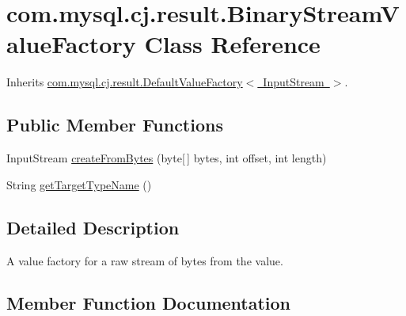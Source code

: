 \hypertarget{classcom_1_1mysql_1_1cj_1_1result_1_1_binary_stream_value_factory}{}\section{com.\+mysql.\+cj.\+result.\+Binary\+Stream\+Value\+Factory Class Reference}
\label{classcom_1_1mysql_1_1cj_1_1result_1_1_binary_stream_value_factory}


Inherits \mbox{\hyperlink{classcom_1_1mysql_1_1cj_1_1result_1_1_default_value_factory}{com.\+mysql.\+cj.\+result.\+Default\+Value\+Factory$<$ Input\+Stream $>$}}.

\subsection*{Public Member Functions}
\begin{DoxyCompactItemize}
\item 
Input\+Stream \mbox{\hyperlink{classcom_1_1mysql_1_1cj_1_1result_1_1_binary_stream_value_factory_a5ef15898b03e5e381e03b3da41bd2e0e}{create\+From\+Bytes}} (byte\mbox{[}$\,$\mbox{]} bytes, int offset, int length)
\item 
String \mbox{\hyperlink{classcom_1_1mysql_1_1cj_1_1result_1_1_binary_stream_value_factory_ae2de7b6e71fef5a012d3463964c78ffb}{get\+Target\+Type\+Name}} ()
\end{DoxyCompactItemize}


\subsection{Detailed Description}
A value factory for a raw stream of bytes from the value. 

\subsection{Member Function Documentation}
\mbox{\label{classcom_1_1mysql_1_1cj_1_1result_1_1_binary_stream_value_factory_a5ef15898b03e5e381e03b3da41bd2e0e}} 
